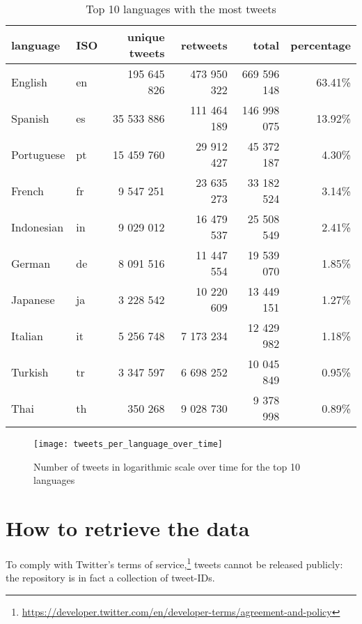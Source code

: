 \begin{table}[H]
    \centering
    \begin{tabularx}{\columnwidth}{@{}XXrrrr@{}}
    		\bottomrule
    		\textbf{language} & \textbf{ISO} & \textbf{unique tweets} & \textbf{retweets} & \textbf{total} & \textbf{percentage} \\
    		\midrule
        English & en & 195 645 826 & 473 950 322 & 669 596 148 & 63.41\% 
        \\
		Spanish & es & 35 533 886 & 111 464 189 & 146 998 075 & 13.92\% 
		\\
		Portuguese & pt & 15 459 760 & 29 912 427 & 45 372 187 & 4.30\% 
		\\
		French & fr & 9 547 251 & 23 635 273 & 33 182 524 & 3.14\% 
		\\
		Indonesian & in & 9 029 012 & 16 479 537 & 25 508 549 & 2.41\%
		\\
		German & de & 8 091 516 & 11 447 554 & 19 539 070 & 1.85\%
		\\
		Japanese & ja & 3 228 542 & 10 220 609 & 13 449 151 & 1.27\%
		\\
		Italian & it & 5 256 748 & 7 173 234 & 12 429 982 & 1.18\%
		\\
		Turkish & tr & 3 347 597 & 6 698 252 & 10 045 849 & 0.95\%
		\\
		Thai & th & 350 268 & 9 028 730 & 9 378 998 & 0.89\%
		\\
		\bottomrule
    \end{tabularx}
    \caption{Top 10 languages with the most tweets}
    \label{tab:dataset-language-stats}
\end{table}

\begin{figure}[H]
	\centering
    	\texttt{[image: tweets\_per\_language\_over\_time]}
    	\caption{Number of tweets in logarithmic scale over time for the top 10 languages}
    	\label{fig:tweets-language-over-time}
\end{figure}

\section{How to retrieve the data}
\label{sec:retrieve-data}

To comply with Twitter's terms of service,\footnote{\url{https://developer.twitter.com/en/developer-terms/agreement-and-policy}} tweets cannot be released publicly: the repository is in fact a collection of tweet-IDs.

